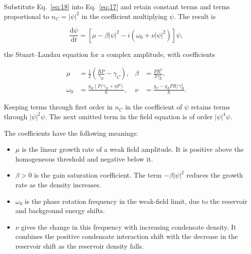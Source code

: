 \documentclass[12pt,a4paper]{article}
\begin{document}
Substitute Eq.~\eqref{eq:18} into Eq.~\eqref{eq:17} and retain constant terms and terms proportional to $n_{C}=|\psi|^2$ in the coefficient multiplying $\psi$. The result is

\begin{equation}\label{eq:19}
\frac{\mathrm d\psi}{\mathrm dt}=[\mu-\beta|\psi|^2-i(\omega_0+\nu|\psi|^2)]\psi,\end{equation}

the Stuart--Landau equation for a complex amplitude, with coefficients

\begin{equation}\label{eq:20}
\begin{aligned}
\mu&=\frac12\left(\frac{RP}{\gamma_R}-\gamma_C\right),&
\beta&=\frac{PR^2}{2\gamma_R^2},\\
\omega_0&=\frac{g_R(P/\gamma_R+\eta P)}{\hbar},&
\nu&=\frac{g_C-g_RPR/\gamma_R^2}{\hbar}.
\end{aligned}\end{equation}

Keeping terms through first order in $n_{C}$ in the coefficient of $\psi$ retains terms through $|\psi|^2 \psi$. The next omitted term in the field equation is of order $|\psi|^4 \psi$.

The coefficients have the following meanings:

\begin{itemize}\setlength{\itemsep}{3pt}\item $\mu$ is the linear growth rate of a weak field amplitude. It is positive above the homogeneous threshold and negative below it.\end{itemize}

\begin{itemize}\setlength{\itemsep}{3pt}\item $\beta>0$ is the gain saturation coefficient. The term $-\beta|\psi|^2$ reduces the growth rate as the density increases.\end{itemize}

\begin{itemize}\setlength{\itemsep}{3pt}\item $\omega_{0}$ is the phase rotation frequency in the weak-field limit, due to the reservoir and background energy shifts.\end{itemize}

\begin{itemize}\setlength{\itemsep}{3pt}\item $\nu$ gives the change in this frequency with increasing condensate density. It combines the positive condensate interaction shift with the decrease in the reservoir shift as the reservoir density falls.\end{itemize}
\end{document}
